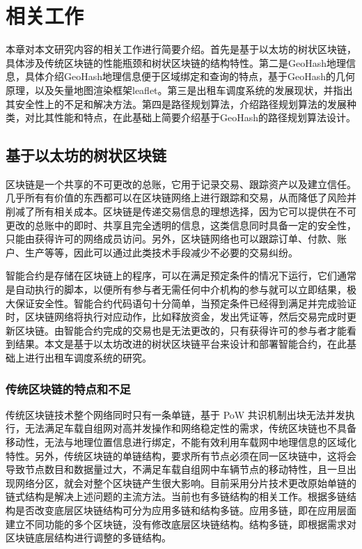 \chapter{相关工作}
本章对本文研究内容的相关工作进行简要介绍。首先是基于以太坊的树状区块链，具体涉及传统区块链的性能瓶颈和树状区块链的结构特性。第二是GeoHash地理信息，具体介绍GeoHash地理信息便于区域绑定和查询的特点，基于GeoHash的几何原理，以及矢量地图渲染框架leaflet。第三是出租车调度系统的发展现状，并指出其安全性上的不足和解决方法。第四是路径规划算法，介绍路径规划算法的发展种类，对比其性能和特点，在此基础上简要介绍基于GeoHash的路径规划算法设计。

\section{基于以太坊的树状区块链}
区块链是一个共享的不可更改的总账，它用于记录交易、跟踪资产以及建立信任。几乎所有有价值的东西都可以在区块链网络上进行跟踪和交易，从而降低了风险并削减了所有相关成本。区块链是传递交易信息的理想选择，因为它可以提供在不可更改的总账中的即时、共享且完全透明的信息，这类信息同时具备一定的安全性，只能由获得许可的网络成员访问。另外，区块链网络也可以跟踪订单、付款、账户、生产等等，因此可以通过此类技术手段减少不必要的交易纠纷。\par
智能合约是存储在区块链上的程序，可以在满足预定条件的情况下运行，它们通常是自动执行的脚本，以便所有参与者无需任何中介机构的参与就可以立即结果，极大保证安全性。智能合约代码语句十分简单，当预定条件已经得到满足并完成验证时，区块链网络将执行对应动作，比如释放资金，发出凭证等，然后交易完成时更新区块链。由智能合约完成的交易也是无法更改的，只有获得许可的参与者才能看到结果。本文是基于以太坊改进的树状区块链平台来设计和部署智能合约，在此基础上进行出租车调度系统的研究。

\subsection{传统区块链的特点和不足}
传统区块链技术整个网络同时只有一条单链，基于 PoW 共识机制出块无法并发执行，无法满足车载自组网对高并发操作和网络稳定性的需求，传统区块链也不具备移动性，无法与地理位置信息进行绑定，不能有效利用车载网中地理信息的区域化特性。另外，传统区块链的单链结构，要求所有节点必须在同一区块链中，这将会导致节点数目和数据量过大，不满足车载自组网中车辆节点的移动特性，且一旦出现网络分区，就会对整个区块链产生很大影响。目前采用分片技术更改原始单链的链式结构是解决上述问题的主流方法。当前也有多链结构的相关工作。根据多链结构是否改变底层区块链结构可分为应用多链和结构多链。应用多链，即在应用层面建立不同功能的多个区块链，没有修改底层区块链结构。结构多链，即根据需求对区块链底层结构进行调整的多链结构。
